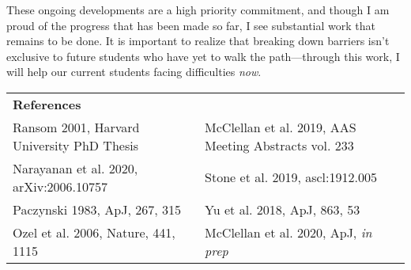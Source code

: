 \documentclass[11pt]{article}
\begin{document}
These ongoing developments are a high priority commitment, and though I am proud of the progress that has been made so far, I see substantial work that remains to be done. It is important to realize that breaking down barriers isn't exclusive to future students who have yet to walk the path---through this work, I will help our current students facing difficulties \textit{now}.

\thispagestyle{empty}
\vspace{0.45cm}
\begin{adjustbox}{}
\begin{tabular}{ll}
    \textbf{References} \\
    Ransom 2001, Harvard University PhD Thesis &
    McClellan et al. 2019, AAS Meeting Abstracts vol. 233\\
    Narayanan et al. 2020, arXiv:2006.10757 &
    Stone et al. 2019, ascl:1912.005\\
    Paczynski 1983, ApJ, 267, 315 &
    Yu et al. 2018, ApJ, 863, 53\\
    Ozel et al. 2006, Nature, 441, 1115&
    McClellan et al. 2020, ApJ, \textit{in prep}
\end{tabular}
\end{adjustbox}


%
%
\end{document}
